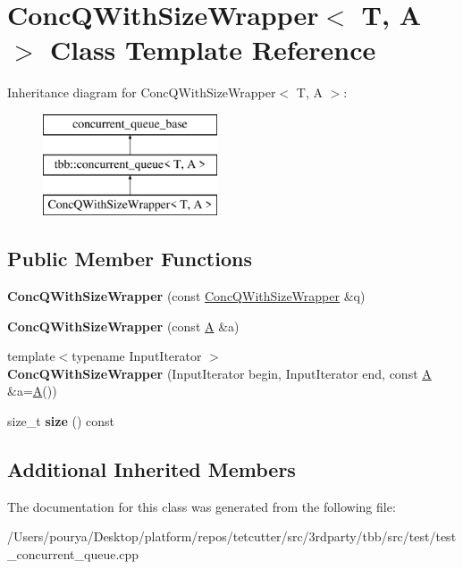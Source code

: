 \hypertarget{classConcQWithSizeWrapper}{}\section{Conc\+Q\+With\+Size\+Wrapper$<$ T, A $>$ Class Template Reference}
\label{classConcQWithSizeWrapper}
Inheritance diagram for Conc\+Q\+With\+Size\+Wrapper$<$ T, A $>$\+:\begin{figure}[H]
\begin{center}
\leavevmode
\includegraphics[height=3.000000cm]{classConcQWithSizeWrapper}
\end{center}
\end{figure}
\subsection*{Public Member Functions}
\begin{DoxyCompactItemize}
\item 
\hypertarget{classConcQWithSizeWrapper_a467615933daa561181d5bc773736024b}{}{\bfseries Conc\+Q\+With\+Size\+Wrapper} (const \hyperlink{classConcQWithSizeWrapper}{Conc\+Q\+With\+Size\+Wrapper} \&q)\label{classConcQWithSizeWrapper_a467615933daa561181d5bc773736024b}

\item 
\hypertarget{classConcQWithSizeWrapper_a3ab0d994b30a21745ace4a63998efa1d}{}{\bfseries Conc\+Q\+With\+Size\+Wrapper} (const \hyperlink{structA}{A} \&a)\label{classConcQWithSizeWrapper_a3ab0d994b30a21745ace4a63998efa1d}

\item 
\hypertarget{classConcQWithSizeWrapper_a5861f3bcc0da375cdfd6749b8311bf04}{}{\footnotesize template$<$typename Input\+Iterator $>$ }\\{\bfseries Conc\+Q\+With\+Size\+Wrapper} (Input\+Iterator begin, Input\+Iterator end, const \hyperlink{structA}{A} \&a=\hyperlink{structA}{A}())\label{classConcQWithSizeWrapper_a5861f3bcc0da375cdfd6749b8311bf04}

\item 
\hypertarget{classConcQWithSizeWrapper_a3f9209fe19845ba74b88163ff793d0f7}{}size\+\_\+t {\bfseries size} () const \label{classConcQWithSizeWrapper_a3f9209fe19845ba74b88163ff793d0f7}

\end{DoxyCompactItemize}
\subsection*{Additional Inherited Members}


The documentation for this class was generated from the following file\+:\begin{DoxyCompactItemize}
\item 
/\+Users/pourya/\+Desktop/platform/repos/tetcutter/src/3rdparty/tbb/src/test/test\+\_\+concurrent\+\_\+queue.\+cpp\end{DoxyCompactItemize}
